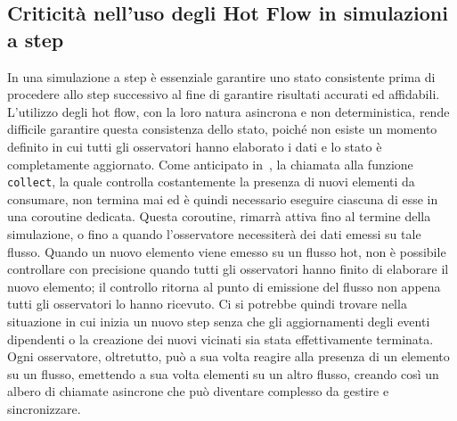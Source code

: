 \documentclass[12pt,a4paper,openright,twoside]{book}
\begin{document}
\subsection{Criticità nell'uso degli Hot Flow in simulazioni a step}
In una simulazione a step è essenziale garantire uno stato consistente prima di procedere allo step successivo al fine di garantire risultati accurati ed affidabili. 
L'utilizzo degli hot flow, con la loro natura asincrona e non deterministica, rende difficile garantire questa consistenza dello stato, poiché non esiste un momento definito in cui tutti gli osservatori hanno elaborato i dati e lo stato è completamente aggiornato. 
Come anticipato in~, la chiamata alla funzione \texttt{collect}, la quale controlla costantemente la presenza di nuovi elementi da consumare, non termina mai ed è quindi necessario eseguire ciascuna di esse in una coroutine dedicata. Questa coroutine, rimarrà attiva fino al termine della simulazione, o fino a quando l'osservatore necessiterà dei dati emessi su tale flusso. 
Quando un nuovo elemento viene emesso su un flusso hot, non è possibile controllare con precisione quando tutti gli osservatori hanno finito di elaborare il nuovo elemento; il controllo ritorna al punto di emissione del flusso non appena tutti gli osservatori lo hanno ricevuto. Ci si potrebbe quindi trovare nella situazione in cui inizia un nuovo step senza che gli aggiornamenti degli eventi dipendenti o la creazione dei nuovi vicinati sia stata effettivamente terminata. 
Ogni osservatore, oltretutto, può a sua volta reagire alla presenza di un elemento su un flusso, emettendo a sua volta elementi su un altro flusso, creando così un albero di chiamate asincrone che può diventare complesso da gestire e sincronizzare. 
\end{document}
